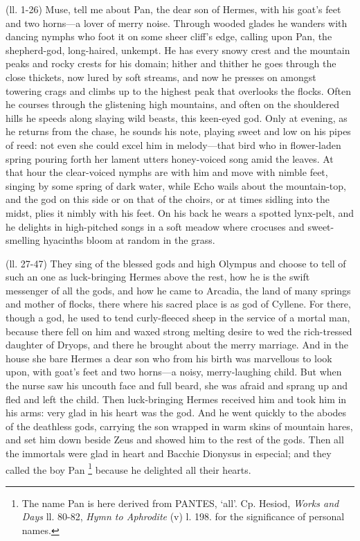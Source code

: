
(ll. 1-26) Muse, tell me about Pan, the dear son of Hermes, with his
goat’s feet and two horns—a lover of merry noise. Through wooded
glades he wanders with dancing nymphs who foot it on some sheer cliff’s
edge, calling upon Pan, the shepherd-god, long-haired, unkempt. He has every
snowy crest and the mountain peaks and rocky crests for his domain; hither and
thither he goes through the close thickets, now lured by soft streams, and now
he presses on amongst towering crags and climbs up to the highest peak that
overlooks the flocks. Often he courses through the glistening high mountains,
and often on the shouldered hills he speeds along slaying wild beasts, this
keen-eyed god. Only at evening, as he returns from the chase, he sounds his
note, playing sweet and low on his pipes of reed: not even she could excel him
in melody—that bird who in flower-laden spring pouring forth her lament
utters honey-voiced song amid the leaves. At that hour the clear-voiced nymphs
are with him and move with nimble feet, singing by some spring of dark water,
while Echo wails about the mountain-top, and the god on this side or on that of
the choirs, or at times sidling into the midst, plies it nimbly with his feet.
On his back he wears a spotted lynx-pelt, and he delights in high-pitched songs
in a soft meadow where crocuses and sweet-smelling hyacinths bloom at random in
the grass.

(ll. 27-47) They sing of the blessed gods and high Olympus and choose to tell
of such an one as luck-bringing Hermes above the rest, how he is the swift
messenger of all the gods, and how he came to Arcadia, the land of many springs
and mother of flocks, there where his sacred place is as god of Cyllene. For
there, though a god, he used to tend curly-fleeced sheep in the service of a
mortal man, because there fell on him and waxed strong melting desire to wed
the rich-tressed daughter of Dryops, and there he brought about the merry
marriage. And in the house she bare Hermes a dear son who from his birth was
marvellous to look upon, with goat’s feet and two horns—a noisy,
merry-laughing child. But when the nurse saw his uncouth face and full beard,
she was afraid and sprang up and fled and left the child. Then luck-bringing
Hermes received him and took him in his arms: very glad in his heart was the
god. And he went quickly to the abodes of the deathless gods, carrying the son
wrapped in warm skins of mountain hares, and set him down beside Zeus and
showed him to the rest of the gods. Then all the immortals were glad in heart
and Bacchie Dionysus in especial; and they called the boy Pan \footnote{The name Pan is here
derived from PANTES, ‘all’. Cp. Hesiod, \emph{Works and
Days} ll. 80-82, \emph{Hymn to Aphrodite} (v) l. 198. for the
significance of personal names.} because he delighted all their
hearts.


